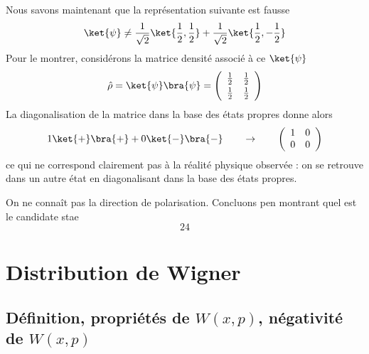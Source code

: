 Nous savons maintenant que la représentation suivante est fausse
\begin{equation}
\ket{\psi} \neq \dfrac{1}{\sqrt{2}}\ket{\frac{1}{2},\frac{1}{2}}+\dfrac{1}{\sqrt{2}}\ket{\frac{1}{2},-\frac{1}{2}}
\end{equation}
Pour le montrer, considérons la matrice densité associé à ce $\ket{\psi}$
\begin{equation}
\hat{\rho} = \ket{\psi}\bra{\psi} = \left(\begin{array}{cc}
\frac{1}{2} & \frac{1}{2}\vspace{1mm}\\
\frac{1}{2} & \frac{1}{2}
\end{array}\right)
\end{equation}
La diagonalisation de la matrice dans la base des états propres donne alors
\begin{equation}
1\ket{+}\bra{+} + 0\ket{-}\bra{-}\qquad\rightarrow\qquad \left(\begin{array}{cc}
1&0\\
0&0
\end{array}\right)
\end{equation}
ce qui ne correspond clairement pas à la réalité physique observée : on se retrouve dans un autre état en diagonalisant 
dans la base des états propres.




On ne connaît pas la direction de polarisation. Concluons pen montrant quel est le candidate stae
\begin{equation}
24
\end{equation}

\section{Distribution de Wigner}
\subsection{Définition, propriétés de $W(x,p)$, négativité de $W(x,p)$}